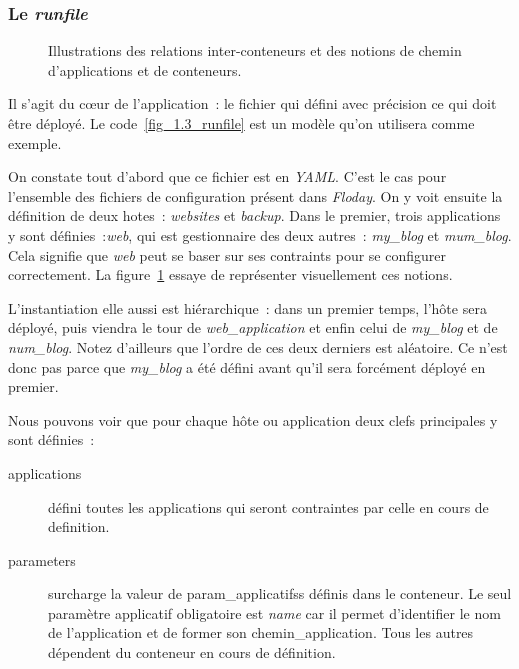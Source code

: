 \subsubsection{Le \emph{runfile}}

\begin{figure}
	\centerfloat
	\caption{Illustrations des relations inter-conteneurs et des notions de chemin d'applications et de conteneurs.}
	\label{relation_conteneurs}
	
\end{figure}



Il s'agit du cœur de l'application~: le fichier qui défini avec précision ce qui doit être déployé.
Le code~\ref{fig_1.3_runfile} est un modèle qu'on utilisera comme exemple.

On constate tout d'abord que ce fichier est en \emph{YAML}.
C'est le cas pour l'ensemble des fichiers de configuration présent dans \emph{Floday}.
On y voit ensuite la définition de deux \glspl{hote}~: \emph{websites} et \emph{backup}.
Dans le premier, trois \glspl{application} y sont définies~:\emph{web}, qui est \gls{gestionnaire} des deux autres~: \emph{my\_blog} et \emph{mum\_blog}.
Cela signifie que \emph{web} peut se baser sur ses \glspl{contraint} pour se configurer correctement.
La figure~\ref{relation_conteneurs} essaye de représenter visuellement ces notions.

L'\gls{instantiation} elle aussi est hiérarchique~: dans un premier temps, l'hôte sera déployé, puis viendra le tour de \emph{web\_application} et enfin celui de \emph{my\_blog} et de \emph{num\_blog}.
Notez d'ailleurs que l'ordre de ces deux derniers est aléatoire.
Ce n'est donc pas parce que \emph{my\_blog} a été défini avant qu'il sera forcément déployé en premier.

Nous pouvons voir que pour chaque hôte ou application deux clefs principales y sont définies~:
\begin{description}
	\item[applications] défini toutes les applications qui seront contraintes par celle en cours de \gls{definition}.
	\item[parameters] surcharge la valeur de \glspl{param_applicatifs} définis dans le conteneur.
		Le seul paramètre applicatif obligatoire est \emph{name} car il permet d'identifier le nom de l'application et de former son \gls{chemin_application}.
		Tous les autres dépendent du conteneur en cours de définition.
\end{description}


